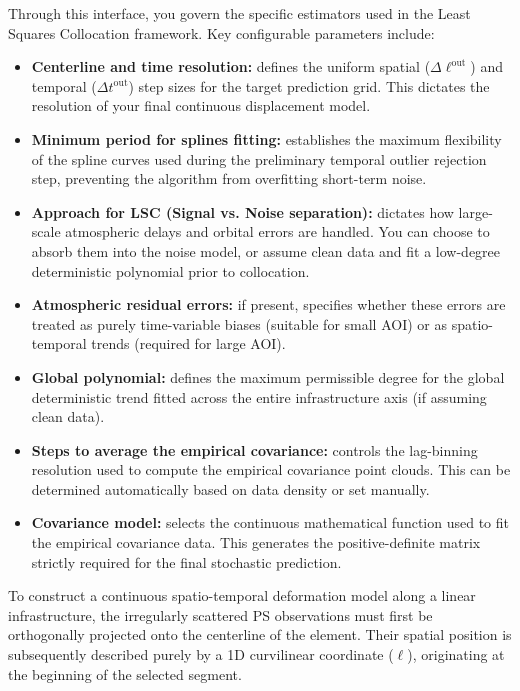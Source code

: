 Through this interface, you govern the specific estimators used in the Least Squares Collocation framework. Key configurable parameters include:
\begin{itemize}
    \item \textbf{Centerline and time resolution:} defines the uniform spatial ($\Delta \ell^\text{out}$) and temporal ($\Delta t^\text{out}$) step sizes for the target prediction grid. This dictates the resolution of your final continuous displacement model.
    \item \textbf{Minimum period for splines fitting:} establishes the maximum flexibility of the spline curves used during the preliminary temporal outlier rejection step, preventing the algorithm from overfitting short-term noise.
    \item \textbf{Approach for LSC (Signal vs. Noise separation):} dictates how large-scale atmospheric delays and orbital errors are handled. You can choose to absorb them into the noise model, or assume clean data and fit a low-degree deterministic polynomial prior to collocation.
    \item \textbf{Atmospheric residual errors:} if present, specifies whether these errors are treated as purely time-variable biases (suitable for small AOI) or as spatio-temporal trends (required for large AOI).
    \item \textbf{Global polynomial:} defines the maximum permissible degree for the global deterministic trend fitted across the entire infrastructure axis (if assuming clean data).
    \item \textbf{Steps to average the empirical covariance:} controls the lag-binning resolution used to compute the empirical covariance point clouds. This can be determined automatically based on data density or set manually.
    \item \textbf{Covariance model:} selects the continuous mathematical function used to fit the empirical covariance data. This generates the positive-definite matrix strictly required for the final stochastic prediction.
\end{itemize}

To construct a continuous spatio-temporal deformation model along a linear infrastructure, the irregularly scattered PS observations must first be orthogonally projected onto the centerline of the element. Their spatial position is subsequently described purely by a 1D curvilinear coordinate ($\ell$), originating at the beginning of the selected segment.


